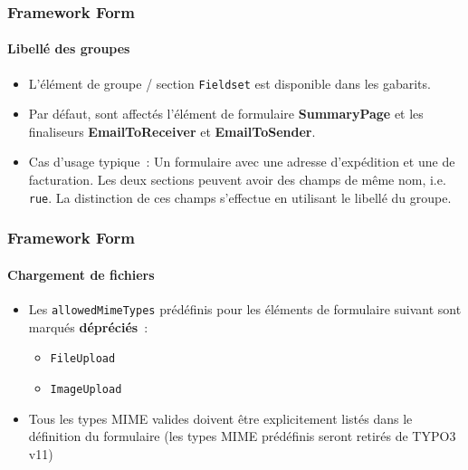 
\begin{frame}[fragile]
	\frametitle{Framework Form}
	\framesubtitle{Libellé des groupes}

	\begin{itemize}
		\item L'élément de groupe / section \texttt{Fieldset} est disponible dans les gabarits.
		\item Par défaut, sont affectés l'élément de formulaire \textbf{SummaryPage} et les finaliseurs \textbf{EmailToReceiver} et \textbf{EmailToSender}.
		\item Cas d'usage typique~:\newline
			\small
				Un formulaire avec une adresse d'expédition et une de facturation. Les deux sections peuvent avoir des
				champs de même nom, i.e. \texttt{rue}. La distinction de ces champs s'effectue en utilisant le libellé du groupe.
			\normalsize

	\end{itemize}

\end{frame}


\begin{frame}[fragile]
	\frametitle{Framework Form}
	\framesubtitle{Chargement de fichiers}

	\begin{itemize}
		\item Les \texttt{allowedMimeTypes} prédéfinis pour les éléments de formulaire
			suivant sont marqués \textbf{dépréciés}~:

			\begin{itemize}
				\item \texttt{FileUpload}
				\item \texttt{ImageUpload}
			\end{itemize}

		\item Tous les types MIME valides doivent être explicitement listés dans le définition du formulaire\newline
			\smaller
				(les types MIME prédéfinis seront retirés de TYPO3 v11)
			\normalsize

	\end{itemize}

\end{frame}

